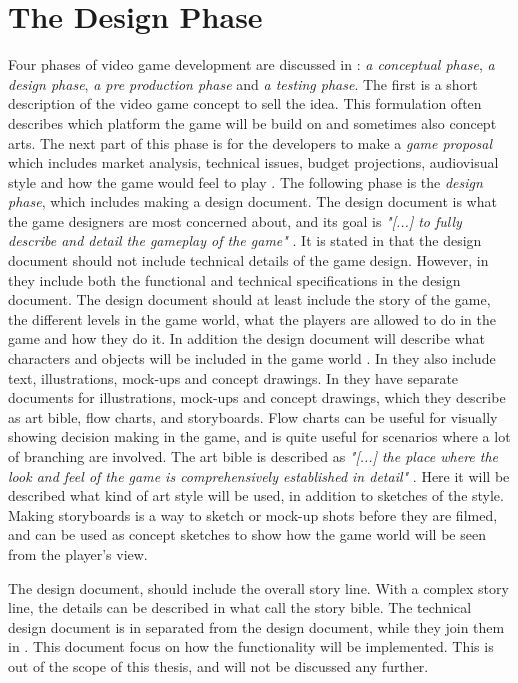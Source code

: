 \section{The Design Phase}
\label{sec:designphase}
Four phases of video game development are discussed in \cite{understandingvg}: \emph{a conceptual phase}, \emph{a design phase}, \emph{a pre production phase} and \emph{a testing phase}. The first is a short description of the video game concept to sell the idea. This formulation often describes which platform the game will be build on and sometimes also concept arts. The next part of this phase is for the developers to make a \emph{game proposal} which includes market analysis, technical issues, budget projections, audiovisual style and how the game would feel to play \cite{understandingvg}. The following phase is the \emph{design phase}, which includes making a design document. The design document is what the game designers are most concerned about, and its goal is \emph{"[...] to fully describe and detail the gameplay of the game"} \cite{gamedesign}. It is stated in \cite{gamedesign} that the design document should not include technical details of the game design. However, in \cite{understandingvg} they include both the functional and technical specifications in the design document. The design document should at least include the story of the game, the different levels in the game world, what the players are allowed to do in the game and how they do it. In addition the design document will describe what characters and objects will be included in the game world \cite{gamedesign}. In \cite{understandingvg} they also include text, illustrations, mock-ups and concept drawings.  In \cite{gamedesign} they have separate documents for illustrations, mock-ups and concept drawings, which they describe as art bible, flow charts, and storyboards. Flow charts can be useful for visually showing decision making in the game, and is quite useful for scenarios where a lot of branching are involved. The art bible is described as \emph{"[...] the place where the look and feel of the game is comprehensively established in detail"} \cite{gamedesign}. Here it will be described what kind of art style will be used, in addition to sketches of the style. Making storyboards is a way to sketch or mock-up shots before they are filmed, and can be used as concept sketches to show how the game world will be seen from the player's view. 

The design document, should include the overall story line. With a complex story line, the details can be described in what \cite{gamedesign} call the story bible.  The technical design document is in \cite{gamedesign} separated from the design document, while they join them in \cite{understandingvg}. This document focus on how the functionality will be implemented. This is out of the scope of this thesis, and will not be discussed any further. 

